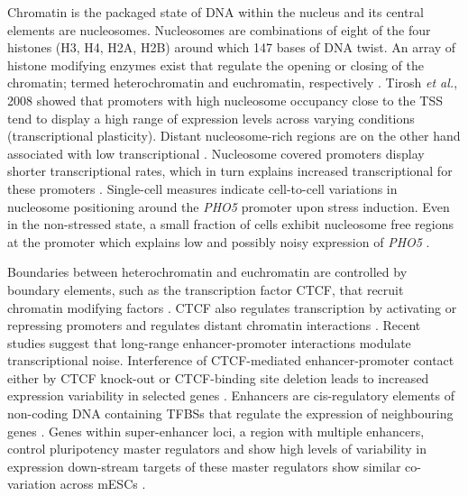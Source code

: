 Chromatin is the packaged state of DNA within the nucleus and its central elements are nucleosomes. 
Nucleosomes are combinations of eight of the four histones (H3, H4, H2A, H2B) around which 147 bases of DNA twist. 
An array of histone modifying enzymes exist that regulate the opening or closing of the chromatin; termed heterochromatin and euchromatin, respectively \citep{Kouzarides2007}. 
Tirosh \textit{et al.}, 2008 showed that promoters with high nucleosome occupancy close to the TSS tend to display a high range of expression levels across varying conditions (transcriptional plasticity). 
Distant nucleosome-rich regions are on the other hand associated with low transcriptional  \citep{Tirosh2008}. 
Nucleosome covered promoters display shorter transcriptional rates, which in turn explains increased transcriptional  for these promoters \cite{Dey2015}. 
Single-cell measures indicate cell-to-cell variations in nucleosome positioning around the \textit{PHO5} promoter upon stress induction. 
Even in the non-stressed state, a small fraction of cells exhibit nucleosome free regions at the promoter which explains low and possibly noisy expression of \textit{PHO5} \citep{Small2014}.
 
\newpage

Boundaries between heterochromatin and euchromatin are controlled by boundary elements, such as the transcription factor \Gls{CTCF}, that recruit chromatin modifying factors \citep{Kouzarides2007}. 
CTCF also regulates transcription by activating or repressing promoters and regulates distant chromatin interactions \citep{Kim2015a}. 
Recent studies suggest that long-range enhancer-promoter interactions modulate transcriptional noise. 
Interference of CTCF-mediated enhancer-promoter contact either by CTCF knock-out or CTCF-binding site deletion leads to increased expression variability in selected genes \citep{Ren2017}. 
Enhancers are cis-regulatory elements of non-coding DNA containing TFBSs that regulate the expression of neighbouring genes \citep{Blackwood1998}. 
Genes within super-enhancer loci, a region with multiple enhancers, control pluripotency master regulators and show high levels of variability in expression down-stream targets of these master regulators show similar co-variation across mESCs \citep{Faure2017}.


